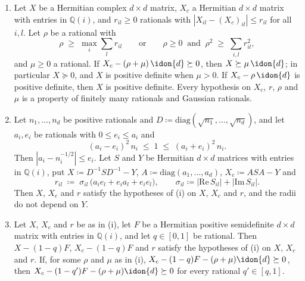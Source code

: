 \begin{lemma}\label{lem:enclosure-psd}
\begin{enumerate}[label=(\roman*),leftmargin=2.4em]
\item Let $X$ be a Hermitian complex $d\times d$ matrix, $X_c$ a Hermitian
  $d\times d$ matrix with entries in $\mathbb{Q}(i)$, and $r_{il}\ge0$
  rationals with $|X_{il}-(X_c)_{il}|\le r_{il}$ for all $i,l$. Let $\rho$ be
  a rational with
  \begin{equation}\label{eq:enclosure-radius}
    \rho\;\ge\;\max_{i}\sum_{l}r_{il}
    \qquad\text{or}\qquad
    \rho\ge0\ \text{ and }\ \rho^{2}\;\ge\;\sum_{i,l}r_{il}^{2},
  \end{equation}
  and $\mu\ge0$ a rational. If $X_c-(\rho+\mu)\,\idon{d}\succeq0$, then
  $X\succeq\mu\,\idon{d}$; in particular $X\succeq0$, and $X$ is positive
  definite when $\mu>0$. If $X_c-\rho\,\idon{d}$ is positive definite, then
  $X$ is positive definite. Every hypothesis on $X_c$, $r$, $\rho$ and $\mu$
  is a property of finitely many rationals and Gaussian rationals.
\item Let $n_1,\dots,n_d$ be positive rationals and
  $D\coloneqq\mathrm{diag}(\sqrt{n_1},\dots,\sqrt{n_d})$, and let $a_i,e_i$
  be rationals with $0\le e_i\le a_i$ and
  \begin{equation}\label{eq:sqrt-enclosure}
    (a_i-e_i)^{2}\,n_i\;\le\;1\;\le\;(a_i+e_i)^{2}\,n_i .
  \end{equation}
  Then $|a_i-n_i^{-1/2}|\le e_i$. Let $S$ and $Y$ be Hermitian $d\times d$
  matrices with entries in $\mathbb{Q}(i)$, put $X\coloneqq D^{-1}SD^{-1}-Y$,
  $A\coloneqq\mathrm{diag}(a_1,\dots,a_d)$, $X_c\coloneqq ASA-Y$ and
  \begin{equation}\label{eq:scaled-radii}
    r_{il}\;\coloneqq\;\sigma_{il}\,\big(a_ie_l+e_ia_l+e_ie_l\big),
    \qquad
    \sigma_{il}\coloneqq|\mathrm{Re}\,S_{il}|+|\mathrm{Im}\,S_{il}| .
  \end{equation}
  Then $X$, $X_c$ and $r$ satisfy the hypotheses of (i) on $X$, $X_c$ and
  $r$, and the radii do not depend on $Y$.
\item Let $X$, $X_c$ and $r$ be as in (i), let $F$ be a Hermitian positive
  semidefinite $d\times d$ matrix with entries in $\mathbb{Q}(i)$, and let
  $q\in[0,1]$ be rational. Then $X-(1-q)F$, $X_c-(1-q)F$ and $r$ satisfy the
  hypotheses of (i) on $X$, $X_c$ and $r$. If, for some $\rho$ and $\mu$ as
  in (i), $X_c-(1-q)F-(\rho+\mu)\idon{d}\succeq0$, then
  $X_c-(1-q')F-(\rho+\mu)\idon{d}\succeq0$ for every rational
  $q'\in[q,1]$.
\end{enumerate}
\end{lemma}

